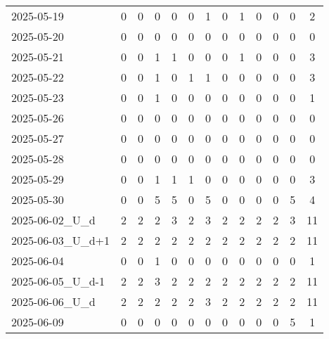\documentclass[dvipdfmx,oneside]{article}
\begin{document}
\begin{longtable}{lcccccccccccc}
        2025-05-19 &     0 &     0 &     0 &     0 &     0 &     1 &     0 &     1 &     0 &     0 &     0 &      2 \\
        2025-05-20 &     0 &     0 &     0 &     0 &     0 &     0 &     0 &     0 &     0 &     0 &     0 &      0 \\
        2025-05-21 &     0 &     0 &     1 &     1 &     0 &     0 &     0 &     1 &     0 &     0 &     0 &      3 \\
        2025-05-22 &     0 &     0 &     1 &     0 &     1 &     1 &     0 &     0 &     0 &     0 &     0 &      3 \\
        2025-05-23 &     0 &     0 &     1 &     0 &     0 &     0 &     0 &     0 &     0 &     0 &     0 &      1 \\
        2025-05-26 &     0 &     0 &     0 &     0 &     0 &     0 &     0 &     0 &     0 &     0 &     0 &      0 \\
        2025-05-27 &     0 &     0 &     0 &     0 &     0 &     0 &     0 &     0 &     0 &     0 &     0 &      0 \\
        2025-05-28 &     0 &     0 &     0 &     0 &     0 &     0 &     0 &     0 &     0 &     0 &     0 &      0 \\
        2025-05-29 &     0 &     0 &     1 &     1 &     1 &     0 &     0 &     0 &     0 &     0 &     0 &      3 \\
        2025-05-30 &     0 &     0 &     5 &     5 &     0 &     5 &     0 &     0 &     0 &     0 &     5 &      4 \\
  2025-06-02\_U\_d &     2 &     2 &     2 &     3 &     2 &     3 &     2 &     2 &     2 &     2 &     3 &     11 \\
2025-06-03\_U\_d+1 &     2 &     2 &     2 &     2 &     2 &     2 &     2 &     2 &     2 &     2 &     2 &     11 \\
        2025-06-04 &     0 &     0 &     1 &     0 &     0 &     0 &     0 &     0 &     0 &     0 &     0 &      1 \\
2025-06-05\_U\_d-1 &     2 &     2 &     3 &     2 &     2 &     2 &     2 &     2 &     2 &     2 &     2 &     11 \\
  2025-06-06\_U\_d &     2 &     2 &     2 &     2 &     2 &     3 &     2 &     2 &     2 &     2 &     2 &     11 \\
        2025-06-09 &     0 &     0 &     0 &     0 &     0 &     0 &     0 &     0 &     0 &     0 &     5 &      1 \\
\end{longtable}
\endgroup
\end{document}
